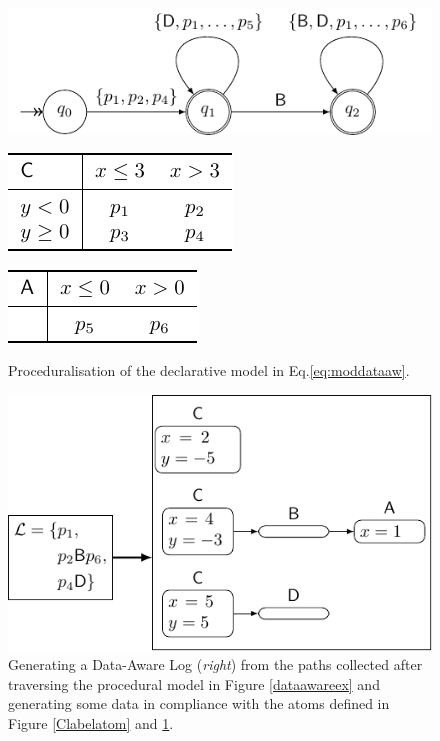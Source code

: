 \documentclass[sigconf]{acmart}
\begin{document}
\begin{figure}[!b]
\centering
\begin{minipage}{\linewidth}
\centering
\includegraphics[scale=.7]{fig/dataaware}
\label{dataawareex}
\end{minipage}

\begin{minipage}{.45\linewidth}\centering
\includegraphics[scale=.8]{fig/tab1b}
\label{Clabelatom}
\end{minipage}\quad \begin{minipage}{.45\linewidth}
\centering
\includegraphics[scale=.8]{fig/tab1c}
\quad\\ \medskip\medskip
{}\label{Alabelatom}
\end{minipage}
\caption{Proceduralisation of the declarative model in Eq.\ref{eq:moddataaw}.}
\end{figure}
\begin{figure}[!t]
\centering
\includegraphics[scale=.7]{fig/loggenerator}
\caption{Generating a Data-Aware Log (\textit{right}) from the paths collected after traversing the procedural model in Figure \ref{dataawareex} and generating some data in compliance with the atoms defined in Figure \ref{Clabelatom} and \ref{Alabelatom}.}\label{loggenex}
\end{figure}
\end{document}
